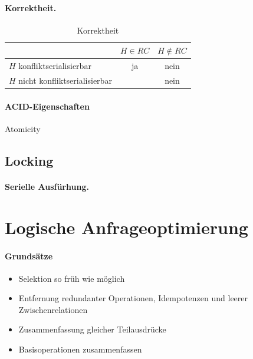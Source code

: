 \documentclass[]{scrartcl}
\begin{document}
\paragraph{Korrektheit.}

\begin{table}[htdp]
\begin{center}
\begin{tabular}{lcc}
 & $H \in RC$ & $H \not \in RC$ \\
 \toprule
 $H$ konfliktserialisierbar & ja & nein \\
 $H$ nicht konfliktserialisierbar & & nein \\
\bottomrule
\end{tabular}
\end{center}
\caption{Korrektheit}
\label{default}
\end{table}%



\paragraph{ACID-Eigenschaften}

\begin{description}
\item[Atomicity] 
\end{description}




\subsection{Locking}

\paragraph{Serielle Ausf\"urhung.} 


\section{Logische Anfrageoptimierung}


\paragraph{Grunds\"atze}

\begin{itemize}
\item Selektion so fr\"uh wie m\"oglich
\item Entfernung redundanter Operationen, Idempotenzen und leerer Zwischenrelationen
\item Zusammenfassung gleicher Teilausdr\"ucke
\item Basisoperationen zusammenfassen
\end{itemize}
\end{document}
